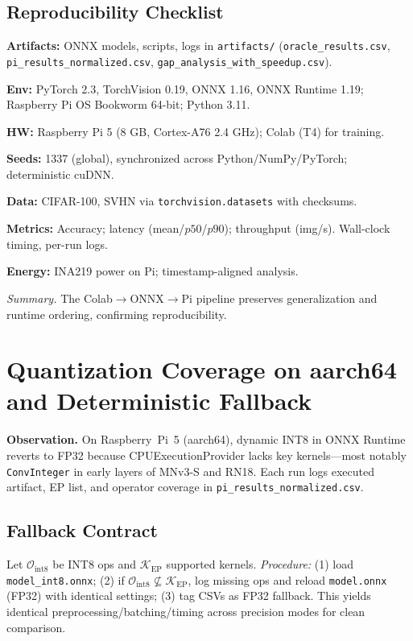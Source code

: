 \documentclass{article}
\begin{document}
\subsection{Reproducibility Checklist}
  \item \textbf{Artifacts:} ONNX models, scripts, logs in \texttt{artifacts/} (\texttt{oracle\_results.csv}, \texttt{pi\_results\_normalized.csv}, \texttt{gap\_analysis\_with\_speedup.csv}).
  \item \textbf{Env:} PyTorch 2.3, TorchVision 0.19, ONNX 1.16, ONNX Runtime 1.19; Raspberry Pi OS Bookworm 64-bit; Python 3.11.
  \item \textbf{HW:} Raspberry Pi 5 (8 GB, Cortex-A76 2.4 GHz); Colab (T4) for training.
  \item \textbf{Seeds:} 1337 (global), synchronized across Python/NumPy/PyTorch; deterministic cuDNN.
  \item \textbf{Data:} CIFAR-100, SVHN via \texttt{torchvision.datasets} with checksums.
  \item \textbf{Metrics:} Accuracy; latency (mean/$p50$/$p90$); throughput (img/s). Wall-clock timing, per-run logs.
  \item \textbf{Energy:} INA219 power on Pi; timestamp-aligned analysis.

\noindent\textit{Summary.} The Colab$\rightarrow$ONNX$\rightarrow$Pi pipeline preserves generalization and runtime ordering, confirming reproducibility.

\section{Quantization Coverage on aarch64 and Deterministic Fallback}
\label{sec:quant_coverage}

\textbf{Observation.}
On Raspberry~Pi~5 (aarch64), dynamic INT8 in ONNX Runtime reverts to FP32 because CPUExecutionProvider lacks key kernels—most notably \texttt{ConvInteger} in early layers of MNv3-S and RN18.  
Each run logs executed artifact, EP list, and operator coverage in \texttt{pi\_results\_normalized.csv}.

\subsection{Fallback Contract}
Let $\mathcal{O}_{\text{int8}}$ be INT8 ops and $\mathcal{K}_{\text{EP}}$ supported kernels.  
\emph{Procedure:} (1) load \texttt{model\_int8.onnx}; (2) if $\mathcal{O}_{\text{int8}}\nsubseteq\mathcal{K}_{\text{EP}}$, log missing ops and reload \texttt{model.onnx} (FP32) with identical settings; (3) tag CSVs as FP32 fallback.  
This yields identical preprocessing/batching/timing across precision modes for clean comparison.
\end{document}
